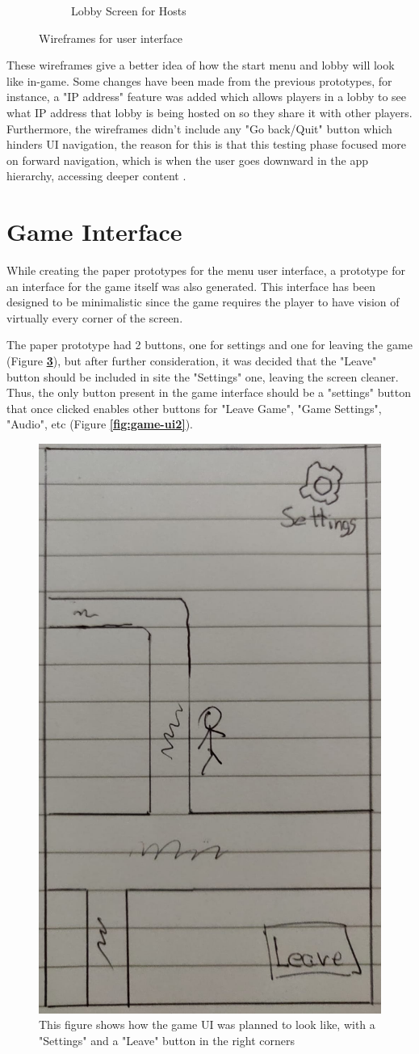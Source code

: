 \documentclass{dissertation}
\begin{document}
\begin{figure}[H]
\begin{subfigure}[h]{.5\textwidth}
\caption{Lobby Screen for Hosts}
\label{fig:pp3}
\end{subfigure}
\caption{Wireframes for user interface}
\label{fig:wireframe}
\end{figure}

These wireframes give a better idea of how the start menu and lobby will look like in-game. Some changes have been made from the previous prototypes, for instance, a "IP address" feature was added which allows players in a lobby to see what IP address that lobby is being hosted on so they share it with other players. Furthermore, the wireframes didn't include any "Go back/Quit" button which hinders UI navigation, the reason for this is that this testing phase focused more on forward navigation, which is when the user goes downward in the app hierarchy, accessing deeper content \citep{mat21}.

\section{Game Interface}

While creating the paper prototypes for the menu user interface, a prototype for an interface for the game itself was also generated. This interface has been designed to be minimalistic since the game requires the player to have vision of virtually every corner of the screen. 

The paper prototype had 2 buttons, one for settings and one for leaving the game (Figure \textbf{\ref{fig:game-ui}}), but after further consideration, it was decided that the "Leave" button should be included in site the "Settings" one, leaving the screen cleaner. Thus, the only button present in the game interface should be a "settings" button that once clicked enables other buttons for "Leave Game", "Game Settings", "Audio", etc (Figure \textbf{\ref{fig:game-ui2}}).

\begin{figure}[H]
\centering
\includegraphics[width = .4\linewidth]{images/paper-prototype5.jpeg}
\caption{This figure shows how the game UI was planned to look like, with a "Settings" and a "Leave" button in the right corners}
\label{fig:game-ui}
\end{figure}
\end{document}
